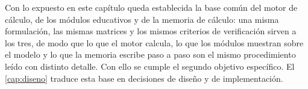 Con lo expuesto en este capítulo queda establecida la base común del motor de cálculo, de los módulos educativos y de la memoria de cálculo: una misma formulación, las mismas matrices y los mismos criterios de verificación sirven a los tres, de modo que lo que el motor calcula, lo que los módulos muestran sobre el modelo y lo que la memoria escribe paso a paso son el mismo procedimiento leído con distinto detalle. Con ello se cumple el segundo objetivo específico. El \autoref{cap:diseno} traduce esta base en decisiones de diseño y de implementación.
